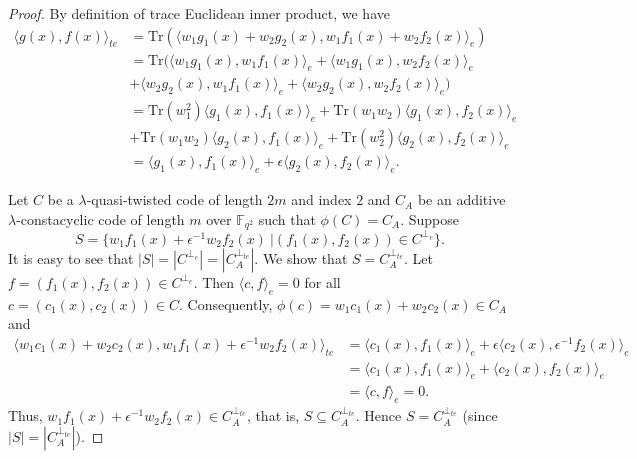 \documentclass[12 pt]{extarticle}
\numberwithin{equation}{section}
\theoremstyle{definition}
\begin{document}
\begin{proof}
    By definition of trace Euclidean inner product, we have 
    \begin{equation*}
        \begin{split}
         \langle g(x),f(x)\rangle_{te}&=\text{Tr}(\langle w_1g_1(x)+w_2g_2(x),w_1f_1(x)+w_2f_2(x)\rangle_e)\\
         &=\text{Tr}(\langle w_1g_1(x),w_1f_1(x)\rangle_e +\langle w_1g_1(x),w_2f_2(x)\rangle_e\\
    &+\langle w_2g_2(x),w_1f_1(x)\rangle_e+\langle w_2g_2(x),w_2f_2(x)\rangle_e)\\
    &=\text{Tr}(w_1^2)\langle g_1(x),f_1(x)\rangle_e +\text{Tr}(w_1w_2)\langle g_1(x),f_2(x)\rangle_e\\
    &+\text{Tr}(w_1w_2)\langle g_2(x),f_1(x)\rangle_e+\text{Tr}(w_2^2)\langle g_2(x),f_2(x)\rangle_e\\
    &=\langle g_1(x),f_1(x)\rangle_e+\epsilon\langle g_2(x),f_2(x)\rangle_e.
        \end{split}
    \end{equation*}

   Let $C$ be a $\lambda$-quasi-twisted code of length $2m$ and index $2$ and  $C_A$ be an additive $\lambda$-constacyclic code of length $m$ over $\mathbb{F}_{q^2}$ such that $\phi(C)=C_A$. Suppose 
   $$S=\{w_1f_1(x)+\epsilon^{-1}w_2f_2(x)\ | (f_1(x),f_2(x))\in C^{\perp_e}\}.$$   
It is easy to see that $|S|=|C^{\perp_e}|=|C_A^{\perp_{te}}|$. We show that $S=C_A^{\perp_{te}}$.  Let $f=(f_1(x),f_2(x))\in C^{\perp_e}$. Then $\langle c,f\rangle_e=0$ for all $c=(c_1(x),c_2(x))\in C$. Consequently,  $\phi(c)=w_1c_1(x)+w_2c_2(x)\in C_A$ and 
   \begin{equation*}
       \begin{split}
        \langle  w_1c_1(x)+w_2c_2(x), w_1f_1(x)+\epsilon^{-1}w_2f_2(x)\rangle_{te}&=\langle c_1(x),f_1(x)\rangle_e+\epsilon \langle c_2(x),\epsilon^{-1}f_2(x)\rangle_e\\
        &= \langle c_1(x),f_1(x)\rangle_e+\langle c_2(x),f_2(x)\rangle_e\\
        &=\langle c,f\rangle_e=0.
       \end{split}
   \end{equation*}
   Thus, $w_1f_1(x)+\epsilon^{-1}w_2f_2(x)\in C_A^{\perp_{te}}$, that is, $S\subseteq C_A^{\perp_{te}}$. Hence $S=C_A^{\perp_{te}}$ (since $|S|=|C_A^{\perp_{te}}|$).
\end{proof}
\end{document}
